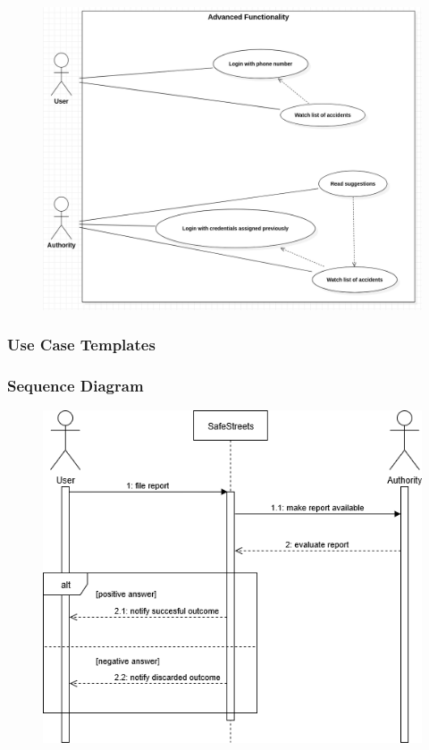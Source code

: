 \begin{figure}
[H]
\includegraphics[width=\textwidth]{Images/Diagrams/UseCase2.png}
\end{figure}

\subsubsection{Use Case Templates}

\subsubsection{Sequence Diagram}
\begin{figure}
[H]
\includegraphics[width=\textwidth]{Images/Diagrams/Sequence1.png}
\end{figure}

